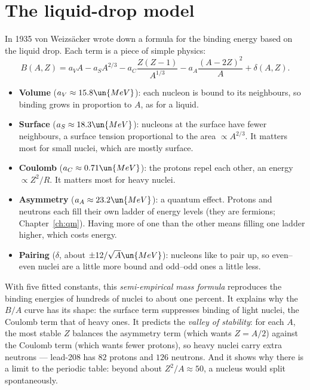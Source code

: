 \section{The liquid-drop model}

In 1935 von Weizs\"acker wrote down a formula for the binding energy based on the liquid drop. Each term is a piece of simple physics:
\[
  B(A,Z) = a_VA - a_SA^{2/3} - a_C\frac{Z(Z-1)}{A^{1/3}} - a_A\frac{(A-2Z)^2}{A} + \delta(A,Z).
\]
\begin{itemize}[itemsep=3pt]
  \item \textbf{Volume} ($a_V\approx15.8\un{MeV}$): each nucleon is bound to its neighbours, so binding grows in proportion to $A$, as for a liquid.
  \item \textbf{Surface} ($a_S\approx18.3\un{MeV}$): nucleons at the surface have fewer neighbours, a surface tension proportional to the area $\propto A^{2/3}$. It matters most for small nuclei, which are mostly surface.
  \item \textbf{Coulomb} ($a_C\approx0.71\un{MeV}$): the protons repel each other, an energy $\propto Z^2/R$. It matters most for heavy nuclei.
  \item \textbf{Asymmetry} ($a_A\approx23.2\un{MeV}$): a quantum effect. Protons and neutrons each fill their own ladder of energy levels (they are fermions; Chapter~\ref{ch:qm}). Having more of one than the other means filling one ladder higher, which costs energy.
  \item \textbf{Pairing} ($\delta$, about $\pm12/\sqrt A\un{MeV}$): nucleons like to pair up, so even--even nuclei are a little more bound and odd--odd ones a little less.
\end{itemize}
With five fitted constants, this \emph{semi-empirical mass formula} reproduces the binding energies of hundreds of nuclei to about one percent. It explains why the $B/A$ curve has its shape: the surface term suppresses binding of light nuclei, the Coulomb term that of heavy ones. It predicts the \emph{valley of stability}: for each $A$, the most stable $Z$ balances the asymmetry term (which wants $Z = A/2$) against the Coulomb term (which wants fewer protons), so heavy nuclei carry extra neutrons --- lead-208 has $82$ protons and $126$ neutrons. And it shows why there is a limit to the periodic table: beyond about $Z^2/A\approx50$, a nucleus would split spontaneously.

